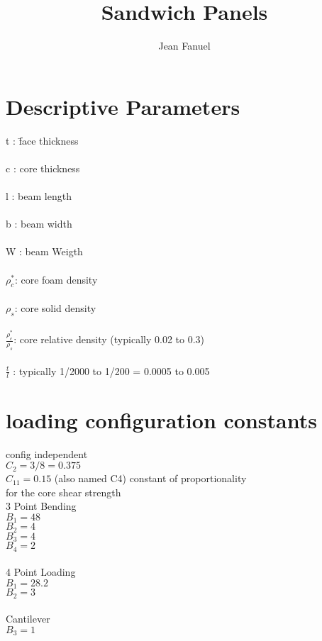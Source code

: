 \documentclass[12pt]{article}
\title{Sandwich Panels}
\author{Jean Fanuel}
\begin{document}
\setlength{\parindent}{1cm}
\maketitle

\normalsize
\section{Descriptive Parameters}

\begin{tabbing}
t : \hspace{0.1cm}  \= face thickness\\
\\
c : \> core thickness\\
\\
l : \> beam length\\
\\
b : \> beam width\\
\\
W : \> beam Weigth\\
\\
$ \rho^*_c $: \> core foam density\\
\\
$ \rho_s $:	\> core solid density\\
\\
\Large $ \frac{\rho_c^*} {\rho_s} $:	\>\normalsize core relative density (typically 0.02 to 0.3)\\
\\
\Large $ \frac{t}{l} $ :	\>\normalsize typically 1/2000 to 1/200 = 0.0005 to 0.005
\end{tabbing}
\vspace{3cm}

\section{loading configuration constants}



\begin{tabbing}
config independent\=  \\
 \> $C_2 = 3/8 = 0.375$ \\
 \> $C_{11} = 0.15$ (also named C4) constant of proportionality\\
 \>\hspace{5.1cm} for the core shear strength\\

3 Point Bending\\
 \> $B_1 = 48$ \\
 \> $B_2 = 4$ \\
 \> $B_3 = 4$ \\
 \> $B_4 = 2$ \\
\\
4 Point Loading \\
 \> $B_1 = 28.2$ \\
 \> $B_2 = 3$\\
\\
Cantilever \\
 \> $B_3 = 1$ 
 
 
\end{tabbing}
\end{document}
